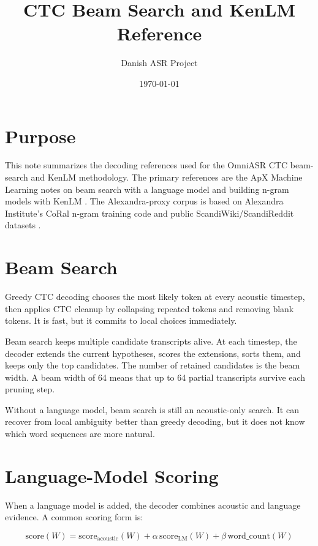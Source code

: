 \documentclass[11pt]{article}
\title{CTC Beam Search and KenLM Reference}
\author{Danish ASR Project}
\date{\today}
\begin{document}
\maketitle

\section{Purpose}

This note summarizes the decoding references used for the OmniASR CTC
beam-search and KenLM methodology. The primary references are the ApX Machine
Learning notes on beam search with a language model and building n-gram models
with KenLM \cite{apxBeamSearchLm,apxKenlmNgram}. The Alexandra-proxy corpus is
based on Alexandra Institute's CoRal n-gram training code and public
ScandiWiki/ScandiReddit datasets
\cite{alexandraCoralNgram,alexandraScandiWiki,alexandraScandiReddit}.

\section{Beam Search}

Greedy CTC decoding chooses the most likely token at every acoustic timestep,
then applies CTC cleanup by collapsing repeated tokens and removing blank
tokens. It is fast, but it commits to local choices immediately.

Beam search keeps multiple candidate transcripts alive. At each timestep, the
decoder extends the current hypotheses, scores the extensions, sorts them, and
keeps only the top candidates. The number of retained candidates is the beam
width. A beam width of 64 means that up to 64 partial transcripts survive each
pruning step.

Without a language model, beam search is still an acoustic-only search. It can
recover from local ambiguity better than greedy decoding, but it does not know
which word sequences are more natural.

\section{Language-Model Scoring}

When a language model is added, the decoder combines acoustic and language
evidence. A common scoring form is:

\[
\mathrm{score}(W) =
\mathrm{score}_{\mathrm{acoustic}}(W)
+ \alpha \, \mathrm{score}_{\mathrm{LM}}(W)
+ \beta \, \mathrm{word\_count}(W)
\]
\end{document}
